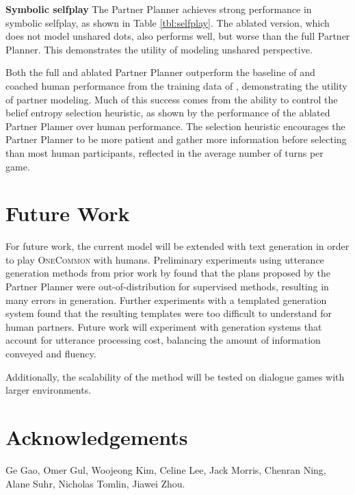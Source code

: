 \documentclass[11pt]{article}
\begin{document}
\textbf{Symbolic selfplay}
The Partner Planner achieves strong performance in symbolic selfplay, as shown in Table \ref{tbl:selfplay}.
The ablated version, which does not model unshared dots, also performs well, but worse than the full Partner Planner.
This demonstrates the utility of modeling unshared perspective.

Both the full and ablated Partner Planner outperform the baseline of \citet{fried} and coached human performance from the training data of \citet{onecommon}, demonstrating the utility of partner modeling.
Much of this success comes from the ability to control the
belief entropy selection heuristic, as shown by the performance of the ablated Partner Planner over human performance.
The selection heuristic encourages the Partner Planner to be more patient and gather more information before selecting than most human participants,
reflected in the average number of turns per game.

\section{Future Work}
For future work, the current model will be extended with text generation in order to play \textsc{OneCommon} with humans.
Preliminary experiments using utterance generation methods from prior work by \citet{fried} found that the plans proposed by the Partner Planner were out-of-distribution for supervised methods, resulting in many errors in generation.
Further experiments with a templated generation system found that the resulting templates were too difficult to understand for human partners.
Future work will experiment with generation systems that account for utterance processing cost, balancing the amount of information conveyed and fluency.

Additionally, the scalability of the method will be tested on dialogue games with larger environments.


\section*{Acknowledgements}
Ge Gao, Omer Gul, Woojeong Kim, Celine Lee, Jack Morris, Chenran Ning, Alane Suhr, Nicholas Tomlin, Jiawei Zhou.
\end{document}
